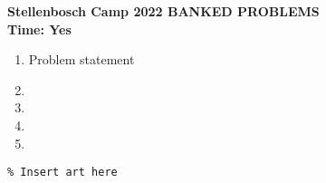 \documentclass{article}
\begin{document}
\thispagestyle{empty}

\begin{center}
  \textbf{\large Stellenbosch Camp 2022 BANKED PROBLEMS}
  \\ \vspace{1em}
  \textbf{\large Time: Yes}
\end{center}

\bigskip

\begin{enumerate}[itemsep=\fill]

\item %
Problem statement

\item %

\item %


\item %


\item %

\end{enumerate}


\centering
\small
\begin{BVerbatim}
\end{BVerbatim}
\end{document}
